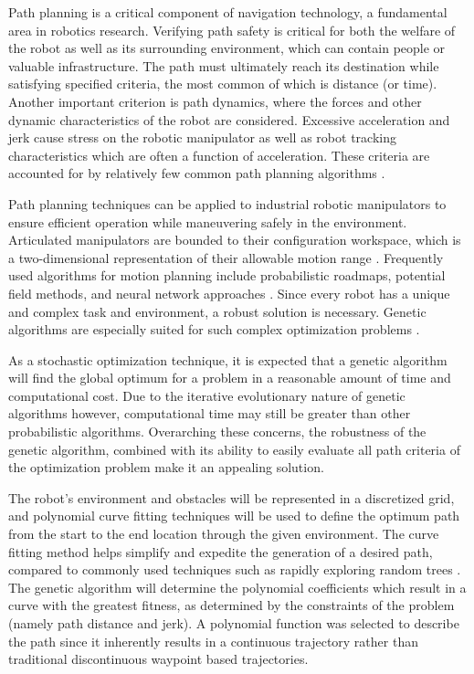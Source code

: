 Path planning is a critical component of navigation technology, a fundamental area in robotics research. Verifying path safety is critical for both the welfare of the robot as well as its surrounding environment, which can contain people or valuable infrastructure. The path must ultimately reach its destination while satisfying specified criteria, the most common of which is distance (or time). Another important criterion is path dynamics, where the forces and other dynamic characteristics of the robot are considered. Excessive acceleration and jerk cause stress on the robotic manipulator as well as robot tracking characteristics which are often a function of acceleration. These criteria are accounted for by relatively few common path planning algorithms \cite{elshamli04}.


Path planning techniques can be applied to industrial robotic manipulators to ensure efficient operation while maneuvering safely in the environment. Articulated manipulators are bounded to their configuration workspace, which is a two-dimensional representation of their allowable motion range \cite{kavraki96}. Frequently used algorithms for motion planning include probabilistic roadmaps, potential field methods, and neural network approaches \cite{sharir89,khosla88,rimon92,yang00}. Since every robot has a unique and complex task and environment, a robust solution is necessary. Genetic algorithms are especially suited for such complex optimization problems \cite{renner03}.

As a stochastic optimization technique, it is expected that a genetic algorithm will find the global optimum for a problem in a reasonable amount of time and computational cost. Due to the iterative evolutionary nature of genetic algorithms however, computational time may still be greater than other probabilistic algorithms. Overarching these concerns, the robustness of the genetic algorithm, combined with its ability to easily evaluate all path criteria of the optimization problem make it an appealing solution.

The robot's environment and obstacles will be represented in a discretized grid, and polynomial curve fitting techniques will be used to define the optimum path from the start to the end location through the given environment. The curve fitting method helps simplify and expedite the generation of a desired path, compared to commonly used techniques such as rapidly exploring random trees \cite{rodriguez06}. The genetic algorithm will determine the polynomial coefficients which result in a curve with the greatest fitness, as determined by the constraints of the problem (namely path distance and jerk). A polynomial function was selected to describe the path since it inherently results in a continuous trajectory rather than traditional discontinuous waypoint based trajectories. 

